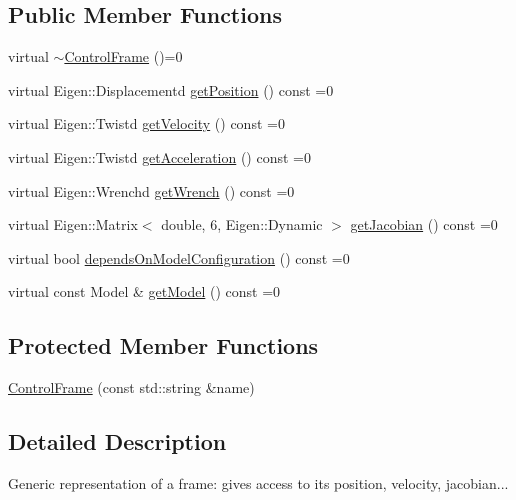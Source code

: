 \subsection*{Public Member Functions}
\begin{DoxyCompactItemize}
\item 
virtual \hyperlink{classocra_1_1ControlFrame_abfbbf55462bf1b256f12316ae3abe357}{$\sim$\+Control\+Frame} ()=0
\item 
virtual Eigen\+::\+Displacementd \hyperlink{classocra_1_1ControlFrame_aaadbbfbcdd5b8e197a0f181ffb2fdcbe}{get\+Position} () const =0
\item 
virtual Eigen\+::\+Twistd \hyperlink{classocra_1_1ControlFrame_a398df839f75886867c86a8e70ac9bf24}{get\+Velocity} () const =0
\item 
virtual Eigen\+::\+Twistd \hyperlink{classocra_1_1ControlFrame_a0ceb7cd7c3fe90fa0ef311b96a6f5c88}{get\+Acceleration} () const =0
\item 
virtual Eigen\+::\+Wrenchd \hyperlink{classocra_1_1ControlFrame_a069aaf1eab98598fbffee263fcde0c56}{get\+Wrench} () const =0
\item 
virtual Eigen\+::\+Matrix$<$ double, 6, Eigen\+::\+Dynamic $>$ \hyperlink{classocra_1_1ControlFrame_a14e0b855979be5dbd360314f25191e77}{get\+Jacobian} () const =0
\item 
virtual bool \hyperlink{classocra_1_1ControlFrame_a65833d1f3f42bc8d452f8b1fb671e142}{depends\+On\+Model\+Configuration} () const =0
\item 
virtual const Model \& \hyperlink{classocra_1_1ControlFrame_ab8a1e5e3d96d7524112b4c88bf0bc5ee}{get\+Model} () const =0
\end{DoxyCompactItemize}
\subsection*{Protected Member Functions}
\begin{DoxyCompactItemize}
\item 
\hyperlink{classocra_1_1ControlFrame_a8ce978cbe6393c6baa232826c48aec55}{Control\+Frame} (const std\+::string \&name)
\end{DoxyCompactItemize}


\subsection{Detailed Description}
Generic representation of a frame\+: gives access to its position, velocity, jacobian... 


